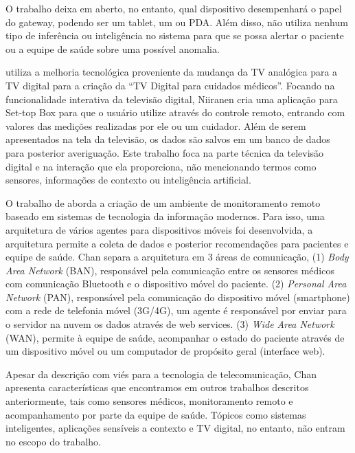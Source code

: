 O trabalho deixa em aberto, no entanto, qual dispositivo desempenhará o papel
do gateway, podendo ser um tablet, um \smartphone[] ou PDA. Além disso, não
utiliza nenhum tipo de inferência ou inteligência no sistema para que se possa
alertar o paciente ou a equipe de saúde sobre uma possível anomalia.

 utiliza a melhoria tecnológica proveniente da
mudança da TV analógica para a TV digital para a criação da ``TV Digital para
cuidados médicos''. Focando na funcionalidade interativa da televisão digital,
Niiranen cria uma aplicação para Set-top Box para que o usuário utilize através
do controle remoto, entrando com valores das medições realizadas por ele ou um
cuidador. Além de serem apresentados na tela da televisão, os dados são salvos
em um banco de dados para posterior averiguação. Este trabalho foca na parte
técnica da televisão digital e na interação que ela proporciona, não
mencionando termos como sensores, informações de contexto ou inteligência
artificial.

O trabalho de  aborda a criação de um ambiente de
monitoramento remoto baseado em sistemas de tecnologia da informação modernos.
Para isso, uma arquitetura de vários agentes para dispositivos móveis foi
desenvolvida, a arquitetura permite a coleta de dados e posterior recomendações
para pacientes e equipe de saúde. Chan separa a arquitetura em 3 áreas de
comunicação, (1) \textit{Body Area Network} (BAN), responsável pela comunicação
entre os sensores médicos com comunicação Bluetooth e o dispositivo móvel do
paciente.  (2) \textit{Personal Area Network} (PAN), responsável pela
comunicação do dispositivo móvel (smartphone) com a rede de telefonia móvel
(3G/4G), um agente é responsável por enviar para o servidor na nuvem os dados
através de web services. (3) \textit{Wide Area Network} (WAN), permite à equipe
de saúde, acompanhar o estado do paciente através de um dispositivo móvel ou um
computador de propósito geral (interface web).

Apesar da descrição com viés para a tecnologia de telecomunicação, Chan
apresenta características que encontramos em outros trabalhos descritos
anteriormente, tais como sensores médicos, monitoramento remoto e
acompanhamento por parte da equipe de saúde. Tópicos como sistemas
inteligentes, aplicações sensíveis a contexto e TV digital, no entanto, não
entram no escopo do trabalho.
